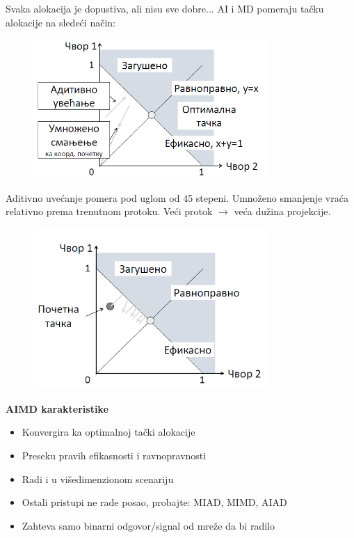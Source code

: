 \documentclass{article} %
\begin{document}
\noindent Svaka alokacija je dopustiva, ali nisu sve dobre... AI i MD pomeraju ta\v cku alokacije na slede\' ci na\v cin:

\begin{figure}[H]
	\centering
	\includegraphics[width=0.8\textwidth]{tcp/aimd.png}
\end{figure}


Aditivno uve\' canje pomera pod uglom od 45 stepeni. Umno\v zeno smanjenje vra\' ca relativno prema trenutnom protoku. Ve\' ci protok $\longrightarrow$ ve\' ca du\v zina projekcije.

\begin{figure}[H]
	\centering
	\includegraphics[width=0.8\textwidth]{tcp/aimd2.png}
\end{figure}


\noindent\textbf{AIMD karakteristike}
\begin{itemize}
	\item Konvergira ka optimalnoj ta\v cki alokacije
	\item Preseku pravih efikasnosti i ravnopravnosti
	\item Radi i u vi\v sedimenzionom scenariju
	\item Ostali pristupi ne rade posao, probajte: MIAD, MIMD, AIAD
	\item Zahteva samo binarni odgovor/signal od mre\v ze da bi radilo
\end{itemize}
\end{document}
